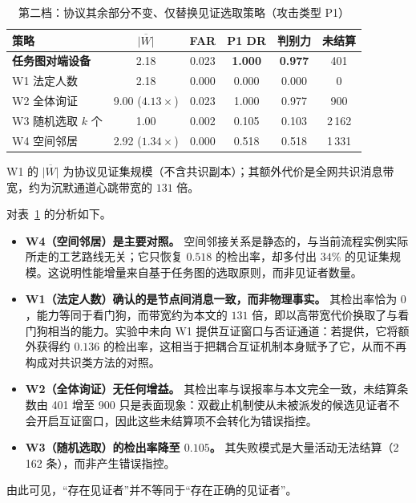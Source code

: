 \documentclass[manuscript,screen,review]{acmart}
\newenvironment{tablenotes}{%
    \par\footnotesize
    \begin{list}{}{%
        \setlength{\leftmargin}{1.5em}%
        \setlength{\labelsep}{0.5em}%
        \setlength{\itemsep}{0pt}%
        \setlength{\parsep}{0pt}%
    }%
}{%
    \end{list}%
}
\begin{document}
\begin{table}[t]
  \centering
  \caption{第二档：协议其余部分不变、仅替换见证选取策略（攻击类型 P1）}
  \label{tab:tier2}
  \small
  \begin{tabular}{@{}lccccc@{}}
    \toprule
    策略 & $\overline{|W|}$ & FAR & P1 DR & 判别力 & 未结算 \\
    \midrule
    \textbf{任务图对端设备} & 2.18 & 0.023 & \textbf{1.000} & \textbf{0.977} & 401 \\
    W1 法定人数 & 2.18 & 0.000 & 0.000 & 0.000 & 0 \\
    W2 全体询证 & 9.00 ($4.13\times$) & 0.023 & 1.000 & 0.977 & 900 \\
    W3 随机选取 $k$ 个 & 1.00 & 0.002 & 0.105 & 0.103 & 2\,162 \\
    W4 空间邻居 & 2.92 ($1.34\times$) & 0.000 & 0.518 & 0.518 & 1\,331 \\
    \bottomrule
  \end{tabular}
  \begin{tablenotes}
    \item W1 的 $\overline{|W|}$ 为协议见证集规模（不含共识副本）；其额外代价是全网共识消息带宽，约为沉默通道心跳带宽的 $131$ 倍。
  \end{tablenotes}
\end{table}

对表~\ref{tab:tier2} 的分析如下。
\begin{itemize}[leftmargin=*,itemsep=2pt]
  \item \textbf{W4（空间邻居）是主要对照。} 空间邻接关系是静态的，与当前流程实例实际所走的工艺路线无关；它只恢复 $0.518$ 的检出率，却多付出 $34\%$ 的见证集规模。这说明性能增量来自基于任务图的选取原则，而非见证者数量。
  \item \textbf{W1（法定人数）确认的是节点间消息一致，而非物理事实。} 其检出率恰为 $0$，能力等同于看门狗，而带宽约为本文的 $131$ 倍，即以高带宽代价换取了与看门狗相当的能力。实验中未向 W1 提供互证窗口与否证通道：若提供，它将额外获得约 $0.136$ 的检出率，这相当于把耦合互证机制本身赋予了它，从而不再构成对共识类方法的对照。
  \item \textbf{W2（全体询证）无任何增益。} 其检出率与误报率与本文完全一致，未结算条数由 401 增至 900 只是表面现象：双截止机制使从未被派发的候选见证者不会开启互证窗口，因此这些未结算项不会转化为错误指控。
  \item \textbf{W3（随机选取）的检出率降至 $0.105$。} 其失败模式是大量活动无法结算（2\,162 条），而非产生错误指控。
\end{itemize}
由此可见，``存在见证者''并不等同于``存在正确的见证者''。
\end{document}
